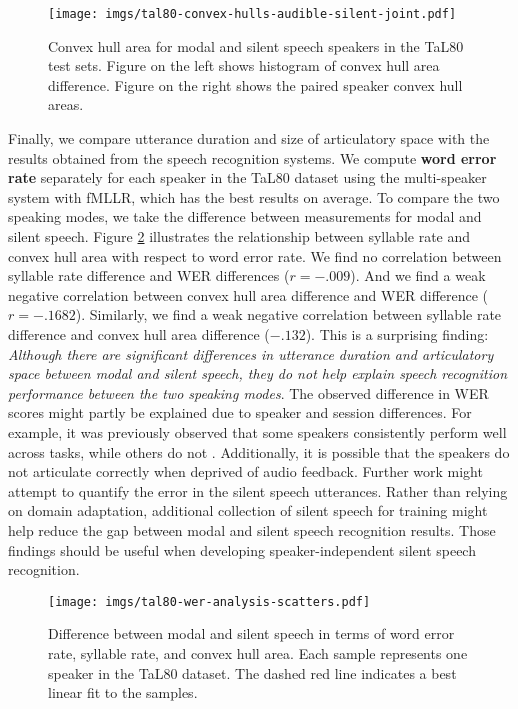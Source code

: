 \documentclass[a4paper]{article}
\begin{document}
\begin{figure}[t]
  \centering
  \texttt{[image: imgs/tal80-convex-hulls-audible-silent-joint.pdf]}
  \caption{Convex hull area for modal and silent speech speakers in the TaL80 test sets. Figure on the left shows histogram of convex hull area difference. Figure on the right shows the paired speaker convex hull areas.}
  \label{fig:hull-area-hist-scatter}
\end{figure}


Finally, we compare utterance duration and size of articulatory space with the results obtained from the speech recognition systems.
We compute \textbf{word error rate} separately for each speaker in the TaL80 dataset using the multi-speaker system with fMLLR, which has the best results on average.
To compare the two speaking modes, we take the difference between measurements for modal and silent speech.
Figure \ref{fig:wer-sylrate-hullarea-scatter} illustrates the relationship between syllable rate and convex hull area with respect to word error rate.
We find no correlation between syllable rate difference and WER differences ($r=-.009$).
And we find a weak negative correlation between convex hull area difference and WER difference ($r=-.1682$).
Similarly, we find a weak negative correlation between syllable rate difference and convex hull area difference ($-.132$).
This is a surprising finding:
\emph{Although there are significant differences in utterance duration and articulatory space between modal and silent speech, they do not help explain speech recognition performance between the two speaking modes}.
The observed difference in WER scores might partly be explained due to speaker and session differences.
For example, it was previously observed that some speakers consistently perform well across tasks, while others do not \cite{ribeiro2021tal}.
Additionally, it is possible that the speakers do not articulate correctly when deprived of audio feedback.
Further work might attempt to quantify the error in the silent speech utterances.
Rather than relying on domain adaptation, additional collection of silent speech for training might help reduce the gap between modal and silent speech recognition results.
Those findings should be useful when developing speaker-independent silent speech recognition.


\begin{figure}[t]
  \centering
  \texttt{[image: imgs/tal80-wer-analysis-scatters.pdf]}
  \caption{Difference between modal and silent speech in terms of word error rate, syllable rate, and convex hull area. Each sample represents one speaker in the TaL80 dataset. The dashed red line indicates a best linear fit to the samples.}
  \label{fig:wer-sylrate-hullarea-scatter}
\end{figure}
\end{document}
